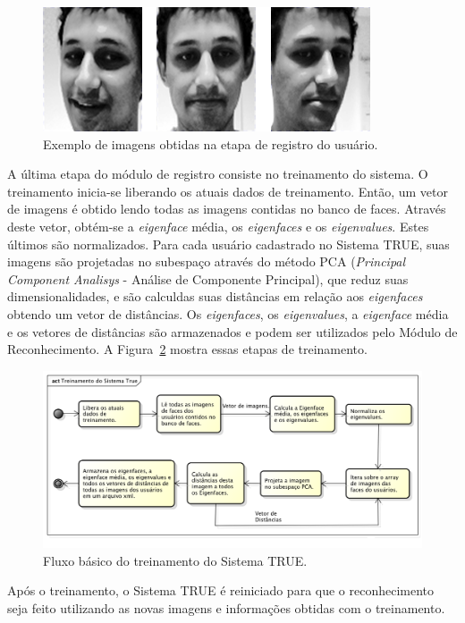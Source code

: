 		\begin{figure}[htb]
			\begin{center}
				\includegraphics[scale=0.4]{figuras/4.ProblemaEProposta/face-registro.png}
			\end{center}
			\caption{Exemplo de imagens obtidas na etapa de registro do usuário.}
			\label{fig:imgs-cadastro}
		\end{figure}	

	A última etapa do módulo de registro consiste no treinamento do sistema. O treinamento inicia-se liberando os atuais dados de treinamento. Então, um vetor de imagens é obtido lendo todas as imagens contidas no banco de faces. Através deste vetor, obtém-se a \textit{eigenface} média, os \textit{eigenfaces} e os \textit{eigenvalues}. Estes últimos são normalizados. Para cada usuário cadastrado no Sistema TRUE, suas imagens são projetadas no subespaço através do método PCA (\textit{Principal Component Analisys} - Análise de Componente Principal), que reduz suas dimensionalidades, e são calculdas suas distâncias em relação aos \textit{eigenfaces} obtendo um vetor de distâncias. Os \textit{eigenfaces}, os \textit{eigenvalues}, a \textit{eigenface} média e os vetores de distâncias são armazenados e podem ser utilizados pelo Módulo de Reconhecimento. A Figura~\ref{fig:treinamento} mostra essas etapas de treinamento.

		\begin{figure}[htb]
			\begin{center}
				\includegraphics[scale=0.5]{figuras/4.ProblemaEProposta/diagrama-registro.png}
			\end{center}
			\caption{Fluxo básico do treinamento do Sistema TRUE.}
			\label{fig:treinamento}
		\end{figure}	

	Após o treinamento, o Sistema TRUE é reiniciado para que o reconhecimento seja feito utilizando as novas imagens e informações obtidas com o treinamento.